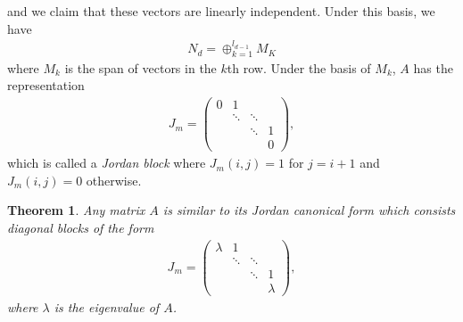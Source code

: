 \documentclass[11pt]{book}
\newtheorem{theorem}{Theorem}[chapter]
\theoremstyle{definition}
\numberwithin{equation}{chapter}
\begin{document}
and we claim that these vectors are linearly independent. Under this basis, we have 
\begin{align*}
    N_d = \oplus^{l_{d-1}}_{k=1} M_K
\end{align*}
where $M_k$ is the span of vectors in the $k$th row. Under the basis of $M_k$, $A$ has the representation
\begin{align*}
    J_m = \begin{pmatrix}
    0 & 1 &  &  \\
     &\ddots & \ddots & \\
     &   & \ddots & 1 \\
     &  &  & 0
    \end{pmatrix},
\end{align*}
which is called a \emph{Jordan block} where $J_m(i,j) = 1$ for $j = i+1$ and $J_m(i,j) = 0$ otherwise.

\medskip

\begin{theorem}
Any matrix $A$ is similar to its Jordan canonical form which consists diagonal blocks of the form 
\begin{align*}
    J_m = \begin{pmatrix}
    \lambda & 1 &  &  \\
     &\ddots & \ddots & \\
     &   & \ddots & 1 \\
     &  &  & \lambda
    \end{pmatrix},
\end{align*}
where $\lambda$ is the eigenvalue of $A$.
\end{theorem}

\medskip
\end{document}
